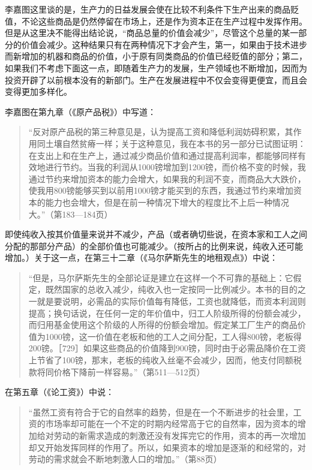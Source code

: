 李嘉图这里谈的是，生产力的日益发展会使在比较不利条件下生产出来的商品贬值，不论这些商品是仍然停留在市场上，还是作为资本正在生产过程中发挥作用。但是从这里决不能得出结论说，“商品总量的价值会减少”，尽管这个总量的某一部分的价值会减少。这种结果只有在两种情况下才会产生，第一，如果由于技术进步而新增加的机器和商品的价值，小于原有同类商品的价值已经贬值的部分；第二，如果我们不考虑下面这一点，即随着生产力的发展，生产领域也不断增加，因而为投资开辟了以前根本没有的新部门。生产在发展进程中不仅会变得更便宜，而且会变得更加多样化。

李嘉图在第九章（《原产品税》）中写道：

\begin{quote}{“反对原产品税的第三种意见是，认为提高工资和降低利润妨碍积累，其作用同土壤自然贫瘠一样；关于这种意见，我在本书的另一部分已试图证明：在支出上和在生产上，通过减少商品价值和通过提高利润率，都能够同样有效地进行节约。当我的利润从1000镑增加到1200镑，而价格不变的时候，我通过节约来增加资本的能力会增大，如果我的利润不变，而商品大大跌价，使我用800镑能够买到以前用1000镑才能买到的东西，我通过节约来增加资本的能力也会增大，但是在前一种情况下增大的程度比不上后一种情况大。”（第183—184页）}\end{quote}

即使纯收入按其价值量来说并不减少，产品（或者确切些说，在资本家和工人之间分配的那部分产品）的全部价值也可能减少。（按所占的比例来说，纯收入还可能增加。）关于这一点，在第三十二章（《马尔萨斯先生的地租观点》）中说：

\begin{quote}{“但是，马尔萨斯先生的全部论证是建立在这样一个不可靠的基础上：它假定，既然国家的总收入减少，纯收入也一定按同一比例减少。本书的目的之一就是要说明，必需品的实际价值每有降低，工资也就降低，而资本利润则提高；换句话说，在任何一定的年价值中，归工人阶级所得的份额会减少，而归用基金使用这个阶级的人所得的份额会增加。假定某工厂生产的商品价值为1000镑，这一价值在老板和他的工人之间分配，工人得800镑，老板得200镑。［729］如果这些商品的价值降到900镑，同时由于必需品降价在工资上节省了100镑，那末，老板的纯收入丝毫不会减少，因而，他支付同额税款将同价格下降前一样容易。”（第511—512页）}\end{quote}

在第五章（《论工资》）中说：

\begin{quote}{“虽然工资有符合于它的自然率的趋势，但是在一个不断进步的社会里，工资的市场率却可能在一个不定的时期内经常高于它的自然率，因为资本的增加给对劳动的新需求造成的刺激还没有发挥完它的作用，资本的再一次增加却又开始发挥同样的作用了。所以，如果资本的增加是逐渐的和经常的，对劳动的需求就会不断地刺激人口的增加。”（第88页）}\end{quote}

